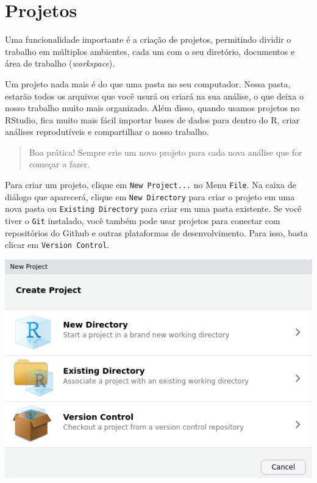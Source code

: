 \documentclass[]{book}
\begin{document}
\hypertarget{projetos}{%
\section{Projetos}\label{projetos}}

Uma funcionalidade importante é a criação de projetos, permitindo dividir o trabalho em múltiplos ambientes, cada um com o seu diretório, documentos e área de trabalho (\emph{workspace}).

Um projeto nada mais é do que uma pasta no seu computador. Nessa pasta, estarão todos os arquivos que você usurá ou criará na sua análise, o que deixa o nosso trabalho muito mais organizado. Além disso, quando usamos projetos no RStudio, fica muito mais fácil importar bases de dados para dentro do R, criar análises reprodutíveis e compartilhar o nosso trabalho.

\begin{quote}
Boa prática! Sempre crie um novo projeto para cada nova análise que for começar a fazer.
\end{quote}

Para criar um projeto, clique em \texttt{New\ Project...} no Menu \texttt{File}. Na caixa de diálogo que aparecerá, clique em \texttt{New\ Directory} para criar o projeto em uma nova pasta ou \texttt{Existing\ Directory} para criar em uma pasta existente. Se você tiver o \texttt{Git} instalado, você também pode usar projetos para conectar com repositórios do Github e outras plataformas de desenvolvimento. Para isso, basta clicar em \texttt{Version\ Control}.

\begin{center}\includegraphics[width=7.4in]{img/rstudio/projetos} \end{center}
\end{document}
